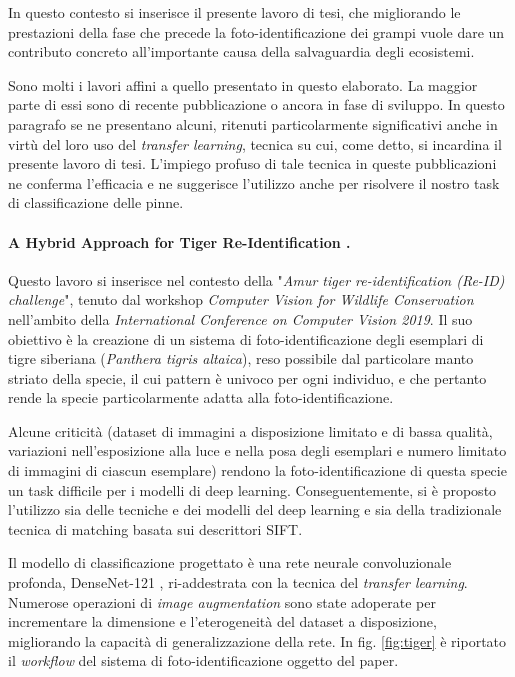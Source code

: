 In questo contesto si inserisce il presente lavoro di tesi, che migliorando le prestazioni della fase che precede la foto-identificazione dei grampi vuole dare un contributo concreto all'importante causa della salvaguardia degli ecosistemi.

Sono molti i lavori affini a quello presentato in questo elaborato. La maggior parte di essi sono di recente pubblicazione o ancora in fase di sviluppo. In questo paragrafo se ne presentano alcuni, ritenuti particolarmente significativi anche in virtù del loro uso del \textit{transfer learning}, tecnica su cui, come detto, si incardina il presente lavoro di tesi. L'impiego profuso di tale tecnica in queste pubblicazioni ne conferma l'efficacia e ne suggerisce l'utilizzo anche per risolvere il nostro task di classificazione delle pinne.

\paragraph*{A Hybrid Approach for Tiger Re-Identification \cite{tiger}.}
Questo lavoro si inserisce nel contesto della "\textit{Amur tiger re-identification (Re-ID) challenge}", tenuto dal workshop \textit{Computer Vision for Wildlife Conservation} nell'ambito della \textit{International Conference on Computer Vision 2019}. Il suo obiettivo è la creazione di un sistema di foto-identificazione degli esemplari di tigre siberiana (\textit{Panthera tigris altaica}), reso possibile dal particolare manto striato della specie, il cui pattern è univoco per ogni individuo, e che pertanto rende la specie particolarmente adatta alla foto-identificazione.

Alcune criticità (dataset di immagini a disposizione limitato e di bassa qualità, variazioni nell'esposizione alla luce e nella posa degli esemplari e numero limitato di immagini di ciascun esemplare) rendono la foto-identificazione di questa specie un task difficile per i modelli di deep learning. Conseguentemente, si è proposto l'utilizzo sia delle tecniche e dei modelli del deep learning e sia della tradizionale tecnica di matching basata sui descrittori SIFT.

Il modello di classificazione progettato è una rete neurale convoluzionale profonda, DenseNet-121 \cite{densenet}, ri-addestrata con la tecnica del \textit{transfer learning}. Numerose operazioni di \textit{image augmentation} sono state adoperate per incrementare la dimensione e l'eterogeneità del dataset a disposizione, migliorando la capacità di generalizzazione della rete. In fig. \ref{fig:tiger} è riportato il \textit{workflow} del sistema di foto-identificazione oggetto del paper.

